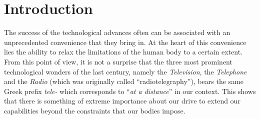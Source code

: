 \chapter{Introduction}
\label{chap:intro}

The success of the technological advances often can be associated with an unprecedented convenience that they bring in. At the heart of 
this convenience lies the ability to relax the limitations of the human body to a certain extent. From this point of view, it is not a 
surprise that the three most prominent technological wonders of the last century, namely the \emph{Television}, the \emph{Telephone} and 
the \emph{Radio} (which was originally called \enquote{radiotelegraphy}), bears the same Greek prefix \emph{tele-} which corresponds to 
\enquote{\emph{at a distance}} in our context. This shows that there is something of extreme importance about our drive to extend our 
capabilities beyond the constraints that our bodies impose.


